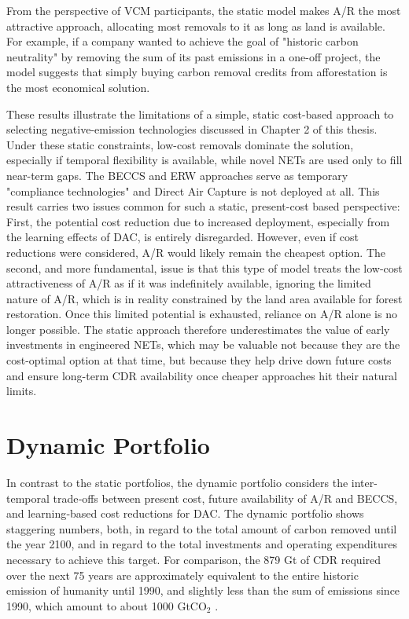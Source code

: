 From the perspective of VCM participants, the static model makes A/R the most attractive approach, allocating most removals to it as long as land is available. For example, if a company wanted to achieve the goal of "historic carbon neutrality" by removing the sum of its past emissions in a one-off project, the model suggests that simply buying carbon removal credits from afforestation is the most economical solution.\vspace{2mm}

These results illustrate the limitations of a simple, static cost-based approach to selecting negative-emission technologies discussed in Chapter 2 of this thesis. Under these static constraints, low-cost removals dominate the solution, especially if temporal flexibility is available, while novel NETs are used only to fill near-term gaps. The BECCS and ERW approaches serve as temporary "compliance technologies" and Direct Air Capture is not deployed at all. This result carries two issues common for such a static, present-cost based perspective: First, the potential cost reduction due to increased deployment, especially from the learning effects of DAC, is entirely disregarded. However, even if cost reductions were considered, A/R would likely remain the cheapest option. The second, and more fundamental, issue is that this type of model treats the low-cost attractiveness of A/R as if it was indefinitely available, ignoring the limited nature of A/R, which is in reality constrained by the land area available for forest restoration. Once this limited potential is exhausted, reliance on A/R alone is no longer possible. The static approach therefore underestimates the value of early investments in engineered NETs, which may be valuable not because they are the cost-optimal option at that time, but because they help drive down future costs and ensure long-term CDR availability once cheaper approaches hit their natural limits.

\section{Dynamic Portfolio}

In contrast to the static portfolios, the dynamic portfolio considers the inter-temporal trade‑offs between present cost, future availability of A/R and BECCS, and learning‑based cost reductions for DAC. The dynamic portfolio shows staggering numbers, both, in regard to the total amount of carbon removed until the year 2100, and in regard to the total investments and operating expenditures necessary to achieve this target. For comparison, the 879 Gt of CDR required over the next 75 years are approximately equivalent to the entire historic emission of humanity until 1990, and slightly less than the sum of emissions since 1990, which amount to about 1000 GtCO$_2$ \parencite{ritchie_co_2020}.\vspace{2mm}

